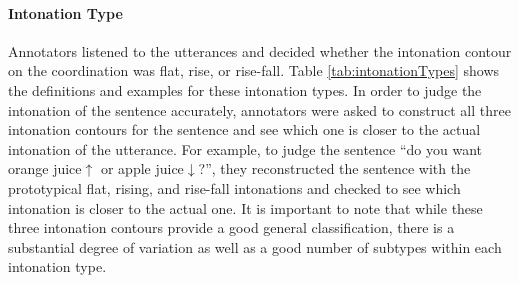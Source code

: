 \documentclass[floatsintext,man]{apa6}
\theoremstyle{definition}
\theoremstyle{definition}
\theoremstyle{definition}
\theoremstyle{remark}
\begin{document}
\paragraph{Intonation Type}\label{intonation-type}

Annotators listened to the utterances and decided whether the intonation
contour on the coordination was flat, rise, or rise-fall. Table
\ref{tab:intonationTypes} shows the definitions and examples for these
intonation types. In order to judge the intonation of the sentence
accurately, annotators were asked to construct all three intonation
contours for the sentence and see which one is closer to the actual
intonation of the utterance. For example, to judge the sentence
\enquote{do you want orange juice\(\uparrow\) or apple
juice\(\downarrow\)?}, they reconstructed the sentence with the
prototypical flat, rising, and rise-fall intonations and checked to see
which intonation is closer to the actual one. It is important to note
that while these three intonation contours provide a good general
classification, there is a substantial degree of variation as well as a
good number of subtypes within each intonation type.
\end{document}
